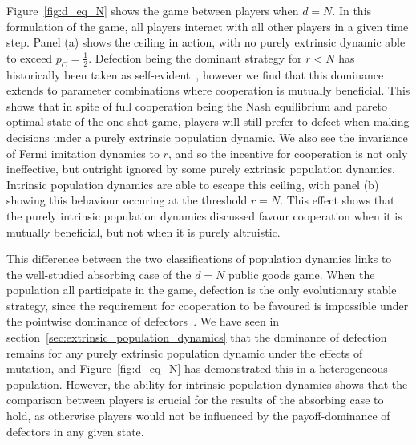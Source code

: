 \documentclass{article}
\begin{document}
Figure~\ref{fig:d_eq_N} shows the game between players when \(d = N\). In this
formulation of the game, all players interact with all other players in a given
time step. Panel (a) shows the ceiling in action, with no purely extrinsic
dynamic able to exceed \(p_C = \frac{1}{2}\). Defection being the dominant
strategy for \(r<N\) has historically been taken as
self-evident~\cite{deng_rare_2012}, however we find that this dominance extends
to parameter combinations where cooperation is mutually beneficial. This shows
that in spite of full cooperation being the Nash equilibrium and pareto optimal
state of the one shot game, players will still prefer to defect when making
decisions under a purely extrinsic population dynamic. We also see the
invariance of Fermi imitation dynamics to \(r\), and so the incentive for
cooperation is not only ineffective, but outright ignored by some purely
extrinsic population dynamics. Intrinsic population dynamics are able to escape
this ceiling, with panel (b) showing this behaviour occuring at the threshold
\(r=N\). This effect shows that the purely intrinsic population dynamics
discussed favour cooperation when it is mutually beneficial, but not when it is
purely altruistic. 

This difference between the two classifications of population dynamics links to
the well-studied absorbing case of the \(d=N\) public goods game. When the
population all participate in the game, defection is the only evolutionary
stable strategy, since the requirement for cooperation to be favoured is
impossible under the pointwise dominance of
defectors~\cite{kurokawa_emergence_2009, kurokawa_generous_2010}. We have seen
in section~\ref{sec:extrinsic_population_dynamics} that the dominance of
defection remains for any purely extrinsic population dynamic under the effects
of mutation, and Figure~\ref{fig:d_eq_N} has demonstrated this in a
heterogeneous population. However, the ability for intrinsic population dynamics
shows that the comparison between players is crucial for the results of the
absorbing case to hold, as otherwise players would not be influenced by the
payoff-dominance of defectors in any given state.
\end{document}
